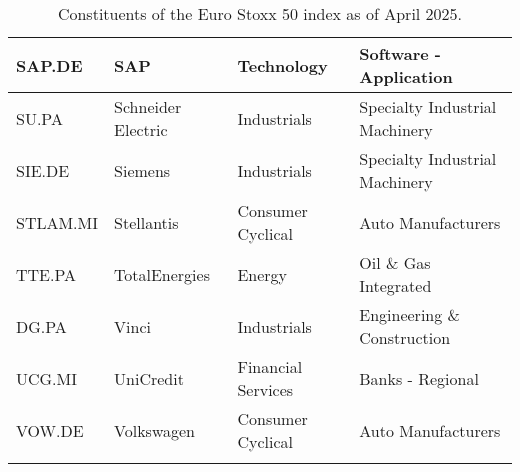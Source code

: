 \begin{longtable}{|p{2cm}|p{3cm}|p{4cm}|p{4cm}|}
SAP.DE & SAP & Technology & Software - Application \\ \hline
SU.PA & Schneider Electric & Industrials & Specialty Industrial Machinery \\ \hline
SIE.DE & Siemens & Industrials & Specialty Industrial Machinery \\ \hline
STLAM.MI & Stellantis & Consumer Cyclical & Auto Manufacturers \\ \hline
TTE.PA & TotalEnergies & Energy & Oil \& Gas Integrated \\ \hline
DG.PA & Vinci & Industrials & Engineering \& Construction \\ \hline
UCG.MI & UniCredit & Financial Services & Banks - Regional \\ \hline
VOW.DE & Volkswagen & Consumer Cyclical & Auto Manufacturers \\ \hline
\caption{Constituents of the Euro Stoxx 50 index as of April 2025. \cite{WikipediaEuroStoxx50}}
\label{tab:eurostoxx50constituents}
\end{longtable}
